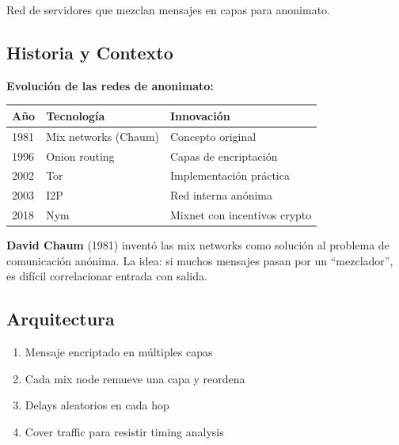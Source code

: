 \documentclass[11pt,a4paper,twoside]{book}
\begin{document}
\begin{definition}[Mixnet]
Red de servidores que mezclan mensajes en capas para anonimato.
\end{definition}

\subsection{Historia y Contexto}

\begin{remark}
\textbf{Evoluci\'on de las redes de anonimato:}

\begin{center}
\begin{tabular}{lll}
\toprule
\textbf{A\~no} & \textbf{Tecnolog\'ia} & \textbf{Innovaci\'on} \\
\midrule
1981 & Mix networks (Chaum) & Concepto original \\
1996 & Onion routing & Capas de encriptaci\'on \\
2002 & Tor & Implementaci\'on pr\'actica \\
2003 & I2P & Red interna an\'onima \\
2018 & Nym & Mixnet con incentivos crypto \\
\bottomrule
\end{tabular}
\end{center}

\textbf{David Chaum} (1981) invent\'o las mix networks como soluci\'on al problema de comunicaci\'on an\'onima. La idea: si muchos mensajes pasan por un ``mezclador'', es dif\'icil correlacionar entrada con salida.
\end{remark}

\subsection{Arquitectura}

\begin{enumerate}
    \item Mensaje encriptado en m\'ultiples capas
    \item Cada mix node remueve una capa y reordena
    \item Delays aleatorios en cada hop
    \item Cover traffic para resistir timing analysis
\end{enumerate}
\end{document}
